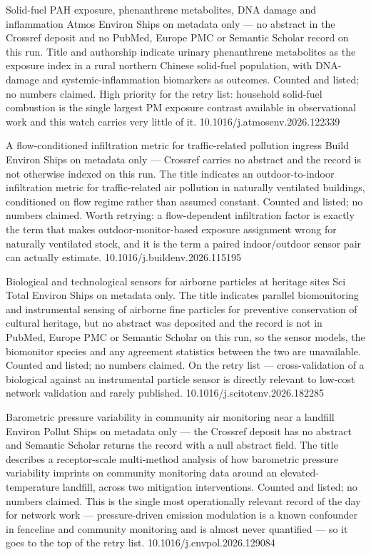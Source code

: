 \documentclass[10pt]{article}
\begin{document}
{Solid-fuel PAH exposure, phenanthrene metabolites, DNA damage and inflammation}
{Atmos Environ}
{Ships on metadata only --- no abstract in the Crossref deposit and no PubMed, Europe PMC
or Semantic Scholar record on this run. Title and authorship indicate urinary
phenanthrene metabolites as the exposure index in a rural northern Chinese solid-fuel
population, with DNA-damage and systemic-inflammation biomarkers as outcomes. Counted and
listed; no numbers claimed. High priority for the retry list: household solid-fuel
combustion is the single largest PM exposure contrast available in observational work and
this watch carries very little of it.}
{10.1016/j.atmosenv.2026.122339}

{A flow-conditioned infiltration metric for traffic-related pollution ingress}
{Build Environ}
{Ships on metadata only --- Crossref carries no abstract and the record is not otherwise
indexed on this run. The title indicates an outdoor-to-indoor infiltration metric for
traffic-related air pollution in naturally ventilated buildings, conditioned on flow
regime rather than assumed constant. Counted and listed; no numbers claimed. Worth
retrying: a flow-dependent infiltration factor is exactly the term that makes
outdoor-monitor-based exposure assignment wrong for naturally ventilated stock, and it is
the term a paired indoor/outdoor sensor pair can actually estimate.}
{10.1016/j.buildenv.2026.115195}


{Biological and technological sensors for airborne particles at heritage sites}
{Sci Total Environ}
{Ships on metadata only. The title indicates parallel biomonitoring and instrumental
sensing of airborne fine particles for preventive conservation of cultural heritage, but
no abstract was deposited and the record is not in PubMed, Europe PMC or Semantic Scholar
on this run, so the sensor models, the biomonitor species and any agreement statistics
between the two are unavailable. Counted and listed; no numbers claimed. On the retry
list --- cross-validation of a biological against an instrumental particle sensor is
directly relevant to low-cost network validation and rarely published.}
{10.1016/j.scitotenv.2026.182285}

{Barometric pressure variability in community air monitoring near a landfill}
{Environ Pollut}
{Ships on metadata only --- the Crossref deposit has no abstract and Semantic Scholar
returns the record with a null abstract field. The title describes a receptor-scale
multi-method analysis of how barometric pressure variability imprints on community
monitoring data around an elevated-temperature landfill, across two mitigation
interventions. Counted and listed; no numbers claimed. This is the single most operationally
relevant record of the day for network work --- pressure-driven emission modulation is a
known confounder in fenceline and community monitoring and is almost never quantified ---
so it goes to the top of the retry list.}
{10.1016/j.envpol.2026.129084}
\end{document}
